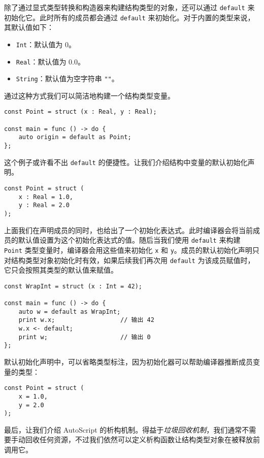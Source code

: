 除了通过显式类型转换和构造器来构建结构类型的对象，还可以通过 \lstinline!default! 来初始化它。此时所有的成员都会通过 \lstinline!default! 来初始化。对于内置的类型来说，其默认值如下：

\begin{itemize}
	\item \lstinline!Int!：默认值为 0。
	\item \lstinline!Real!：默认值为 0.0。
	\item \lstinline!String!：默认值为空字符串 \lstinline!""!。
\end{itemize}

通过这种方式我们可以简洁地构建一个结构类型变量。

\begin{lstlisting}
const Point = struct (x : Real, y : Real);

const main = func () -> do {
	auto origin = default as Point;
};
\end{lstlisting}

这个例子或许看不出 \lstinline!default! 的便捷性。让我们介绍结构中变量的默认初始化声明。

\begin{lstlisting}
const Point = struct (
	x : Real = 1.0,
	y : Real = 2.0
);
\end{lstlisting}

上面我们在声明成员的同时，也给出了一个初始化表达式。此时编译器会将当前成员的默认值设置为这个初始化表达式的值。随后当我们使用 \lstinline!default! 来构建 \lstinline!Point! 类型变量时，编译器会用这些值来初始化 \lstinline!x! 和 \lstinline!y!。成员的默认初始化声明只对结构类型对象初始化时有效，如果后续我们再次用 \lstinline!default! 为该成员赋值时，它只会按照其类型的默认值来赋值。

\begin{lstlisting}
const WrapInt = struct (x : Int = 42);

const main = func () -> do {
	auto w = default as WrapInt;
	print w.x;					// 输出 42
	w.x <- default;
	print w;					// 输出 0
};
\end{lstlisting}

默认初始化声明中，可以省略类型标注，因为初始化器可以帮助编译器推断成员变量的类型：

\begin{lstlisting}
const Point = struct (
    x = 1.0,
    y = 2.0
);
\end{lstlisting}

最后，让我们介绍 AutoScript 的析构机制。得益于\emph{垃圾回收机制}，我们通常不需要手动回收任何资源，不过我们依然可以定义析构函数让结构类型对象在被释放前调用它。

